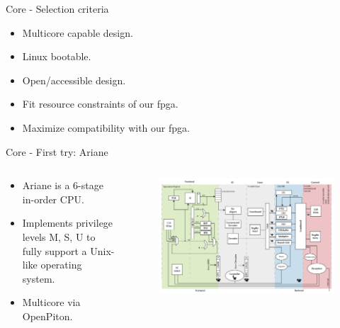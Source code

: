 \begin{frame}{Core - Selection criteria}
  \begin{itemize}
    \item Multicore capable design.
    \item Linux bootable.
    \item Open/accessible design.
    \item Fit resource constraints of our \gls{fpga}. 
    \item Maximize compatibility with our \gls{fpga}.
  \end{itemize}
\end{frame}

\begin{frame}{Core - First try: Ariane}
\begin{columns}[T]
  \begin{column}{0.5\textwidth} %

\begin{itemize}
    \item Ariane is a 6-stage in-order CPU.
    \item Implements privilege levels M, S, U to fully support a Unix-like operating system.
    \item Multicore via OpenPiton.
\end{itemize}
\end{column}
\begin{column}{.5\textwidth} %

\begin{figure}[!ht]
    \includegraphics[width=1.1\linewidth]{images/ariane-diagram.png}
\end{figure}
\end{column}
\end{columns}
\end{frame}

